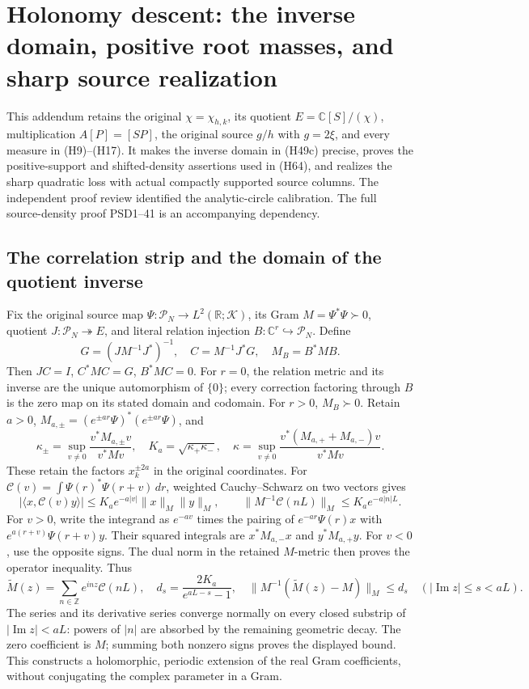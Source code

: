 \documentclass{article}
\begin{document}
\maketitle
\section{Holonomy descent: the inverse domain, positive root masses, and sharp source realization}
This addendum retains the original \(\chi=\chi_{h,k}\), its quotient
\(E=\mathbb C[S]/(\chi)\), multiplication \(A[P]=[SP]\), the original
source \(g/h\) with \(g=2\xi\), and every measure in (H9)--(H17).
It makes the inverse domain in (H49c) precise, proves the positive-support
and shifted-density assertions used in (H64), and realizes the sharp
quadratic loss with actual compactly supported source columns.
The independent proof review identified the analytic-circle calibration.
The full source-density proof PSD1--41 is an accompanying dependency.

\subsection{The correlation strip and the domain of the quotient inverse}
Fix the original source map \(\Psi:\mathcal P_N\to L^2(\mathbb R;\mathcal K)\),
its Gram \(M=\Psi^*\Psi\succ0\), quotient \(J:\mathcal P_N\twoheadrightarrow E\),
and literal relation injection \(B:\mathbb C^r\hookrightarrow\mathcal P_N\).
Define
\[
 G=(JM^{-1}J^*)^{-1},\quad C=M^{-1}J^*G,\quad M_B=B^*MB.
 \tag{HDI1}
\]
Then \(JC=I\), \(C^*MC=G\), \(B^*MC=0\). For \(r=0\), the
relation metric and its inverse are the unique automorphism of
\(\{0\}\); every correction factoring through \(B\) is the zero
map on its stated domain and codomain. For \(r>0\), \(M_B\succ0\).
Retain \(a>0\), \(M_{a,\pm}=(e^{\pm ar}\Psi)^*(e^{\pm ar}\Psi)\), and
\[
 \kappa_\pm=\sup_{v\ne0}\frac{v^*M_{a,\pm}v}{v^*Mv},\quad
 K_a=\sqrt{\kappa_+\kappa_-},\quad
 \kappa=\sup_{v\ne0}\frac{v^*(M_{a,+}+M_{a,-})v}{v^*Mv}.
 \tag{HDI2}
\]
These retain the factors \(x_k^{\pm2a}\) in the original coordinates.
For \(\mathcal C(v)=\int\Psi(r)^*\Psi(r+v)\,dr\), weighted
Cauchy--Schwarz on two vectors gives
\[
 |\langle x,\mathcal C(v)y\rangle|
 \le K_a e^{-a|v|}\|x\|_M\|y\|_M,\qquad
 \|M^{-1}\mathcal C(nL)\|_M\le K_a e^{-a|n|L}.
 \tag{HDI3}
\]
For \(v>0\), write the integrand as \(e^{-av}\) times the pairing
of \(e^{-ar}\Psi(r)x\) with \(e^{a(r+v)}\Psi(r+v)y\).
Their squared integrals are \(x^*M_{a,-}x\) and \(y^*M_{a,+}y\).
For \(v<0\), use the opposite signs. The dual norm in the retained
\(M\)-metric then proves the operator inequality.
Thus
\[
 \widetilde M(z)=\sum_{n\in\mathbb Z}e^{inz}\mathcal C(nL),\quad
 d_s=\frac{2K_a}{e^{aL-s}-1},\quad
 \|M^{-1}(\widetilde M(z)-M)\|_M\le d_s
 \quad(|\operatorname{Im}z|\le s<aL).
 \tag{HDI4}
\]
The series and its derivative series converge normally on every
closed substrip of \(|\operatorname{Im}z|<aL\): powers of \(|n|\)
are absorbed by the remaining geometric decay. The zero coefficient
is \(M\); summing both nonzero signs proves the displayed bound.
This constructs a holomorphic, periodic extension of the real Gram
coefficients, without conjugating the complex parameter in a Gram.
\end{document}
